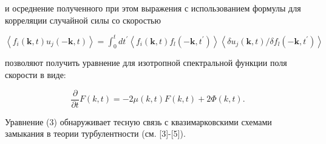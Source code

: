 \documentclass[10pt]{article}
\begin{document}
и осреднение полученного при этом выражения с использованием формулы для корреляции случайной силы со скоростью



$\left\langle f_{i}(\boldsymbol{k}, t) u_{j}(-\boldsymbol{k}, t)\right\rangle=\int_{0}^{t} d t^{\prime}\left\langle f_{i}(\boldsymbol{k}, t) f_{l}\left(-\boldsymbol{k}, t^{\prime}\right)\right\rangle\left\langle\delta u_{j}(\boldsymbol{k}, t) / \delta f_{l}\left(-\boldsymbol{k}, t^{\prime}\right)\right\rangle$



позволяют получить уравнение для изотропной спектральной функции поля скорости в виде:



\[

\frac{\partial}{\partial t} F(k, t)=-2 \mu(k, t) F(k, t)+2 \Phi(k, t) .

\]



Уравнение (3) обнаруживает тесную связь с квазимарковскими схемами замыкания в теории турбулентности (см. [3]-[5]).
\end{document}

